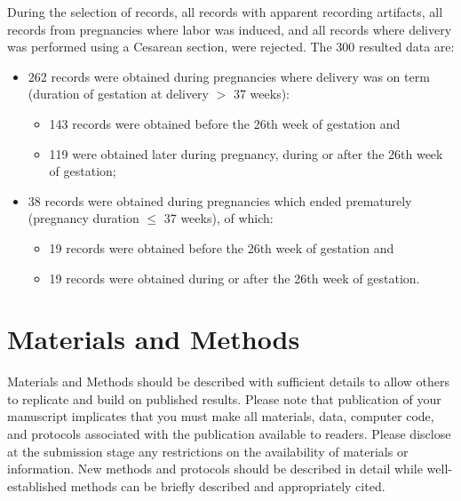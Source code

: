 \documentclass[bioengineering,article,submit,moreauthors,pdftex,10pt,a4paper]{mdpi}
\begin{document}
During the selection of records, all records with apparent recording artifacts, all records from pregnancies where labor was induced, and all records where delivery was performed using a Cesarean section, were rejected. The 300 resulted data are:

\begin{itemize}[leftmargin=*,labelsep=5.8mm]
	
	\item	262 records were obtained during pregnancies where delivery was on term (duration of gestation at delivery $>$ 37 weeks):
	
	\begin{itemize}[leftmargin=*,labelsep=5.8mm]
		\item 143 records were obtained before the 26th week of gestation and	
		
		\item 119 were obtained later during pregnancy, during or after the 26th week of gestation;	
	\end{itemize}
	
	\item	38 records were obtained during pregnancies which ended prematurely (pregnancy duration $\leq$ 37 weeks), of which:
	
	\begin{itemize}[leftmargin=*,labelsep=5.8mm]
		\item 19 records were obtained before the 26th week of gestation and
			
		\item	19 records were obtained during or after the 26th week of gestation.	
	\end{itemize}
	 	
\end{itemize}

 

\section{Materials and Methods}

Materials and Methods should be described with sufficient details to allow others to replicate and build on published results. Please note that publication of your manuscript implicates that you must make all materials, data, computer code, and protocols associated with the publication available to readers. Please disclose at the submission stage any restrictions on the availability of materials or information. New methods and protocols should be described in detail while well-established methods can be briefly described and appropriately cited.
\end{document}
